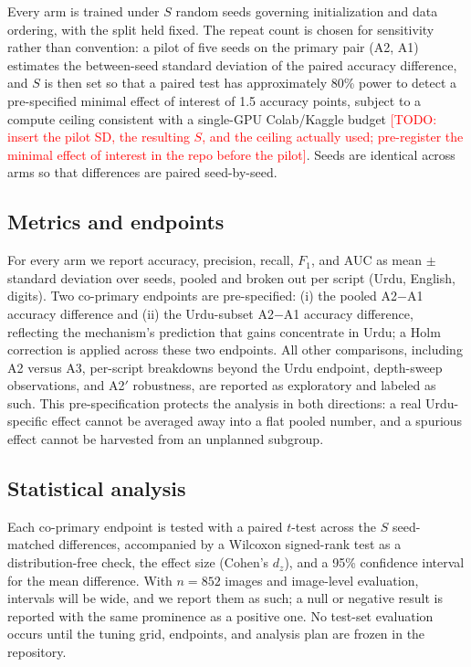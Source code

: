 \documentclass[11pt,a4paper]{article}
\newcommand{\todonote}[1]{\textcolor{red}{[TODO: #1]}}
\begin{document}
Every arm is trained under $S$ random seeds governing initialization
and data ordering, with the split held fixed. The repeat count is
chosen for sensitivity rather than convention: a pilot of five seeds
on the primary pair (A2, A1) estimates the between-seed standard
deviation of the paired accuracy difference, and $S$ is then set so
that a paired test has approximately 80\% power to detect a
pre-specified minimal effect of interest of 1.5 accuracy points,
subject to a compute ceiling consistent with a single-GPU
Colab/Kaggle budget \todonote{insert the pilot SD, the resulting
$S$, and the ceiling actually used; pre-register the minimal effect
of interest in the repo before the pilot}. Seeds are identical across
arms so that differences are paired seed-by-seed.

\subsection{Metrics and endpoints}

For every arm we report accuracy, precision, recall, $F_1$, and AUC
as mean $\pm$ standard deviation over seeds, pooled and broken out
per script (Urdu, English, digits). Two co-primary endpoints are
pre-specified: (i) the pooled A2$-$A1 accuracy difference and (ii)
the Urdu-subset A2$-$A1 accuracy difference, reflecting the
mechanism's prediction that gains concentrate in Urdu; a
Holm correction is applied across these two endpoints. All other
comparisons, including A2 versus A3, per-script breakdowns beyond the
Urdu endpoint, depth-sweep observations, and A2$'$ robustness, are
reported as exploratory and labeled as such. This pre-specification
protects the analysis in both directions: a real Urdu-specific effect
cannot be averaged away into a flat pooled number, and a spurious
effect cannot be harvested from an unplanned subgroup.

\subsection{Statistical analysis}

Each co-primary endpoint is tested with a paired $t$-test across the
$S$ seed-matched differences, accompanied by a Wilcoxon signed-rank
test as a distribution-free check, the effect size (Cohen's $d_z$),
and a 95\% confidence interval for the mean difference. With $n=852$
images and image-level evaluation, intervals will be wide, and we
report them as such; a null or negative result is reported with the
same prominence as a positive one. No test-set evaluation occurs
until the tuning grid, endpoints, and analysis plan are frozen in the
repository.
\end{document}
